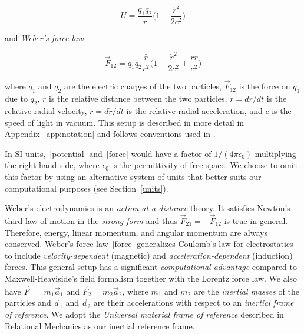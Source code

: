 \documentclass[12pt,a4paper]{article}
\theoremstyle{definition}
\theoremstyle{remark}
\newcommand{\qq}{q_1 q_2}
\newcommand{\rdot}{\dot{r}}
\begin{document}
\begin{equation}\label{potential}
    U = \frac{\qq}{r}\bigg(1 - \frac{\rdot^2}{2c^2}\bigg)
\end{equation}

and \textit{Weber's force law}

\begin{equation}\label{force}
    \vec{F}_{12} = \qq \frac{\hat{r}}{r^2}\bigg(1 - \frac{\rdot^2}{2c^2} + \frac{r\ddot{r}}{c^2}\bigg)
\end{equation}

where $q_1$ and $q_2$ are the electric charges of the two particles, $\vec{F}_{12}$ is the force on $q_1$ due to $q_2$, $r$ is the relative distance between the two particles, $\rdot = dr/dt$ is the relative radial velocity, $\ddot{r} = d\rdot/dt$ is the relative radial acceleration, and $c$ is the speed of light in vacuum. This setup is described in more detail in Appendix~\ref{app:notation} and follows conventions used in \citep{assis-weber}.

In SI units,~\eqref{potential} and~\eqref{force} would have a factor of $1/(4\pi \epsilon_0)$ multiplying the right-hand side, where $\epsilon_0$ is the permittivity of free space. We choose to omit this factor by using an alternative system of units that better suits our computational purposes (see Section~\ref{units}).

Weber's electrodynamics is an \textit{action-at-a-distance} theory. It satisfies Newton's third law of motion in the \textit{strong form} and thus $\vec{F}_{21} = -\vec{F}_{12}$ is true in general. Therefore, energy, linear momentum, and angular momentum are always conserved. Weber's force law~\eqref{force} generalizes Coulomb's law for electrostatics to include \textit{velocity-dependent} (magnetic) and \textit{acceleration-dependent} (induction) forces. This general setup has a significant \textit{computational advantage} compared to Maxwell-Heaviside's field formalism together with the Lorentz force law. We also have $\vec{F}_1 = m_1\vec{a}_1$ and $\vec{F}_2 = m_2\vec{a}_2$, where $m_1$ and $m_2$ are the \textit{inertial masses} of the particles and $\vec{a}_1$ and $\vec{a}_2$ are their accelerations with respect to an \textit{inertial frame of reference}. We adopt the \textit{Universal material frame of reference} described in Relational Mechanics \citep{assis-relational-mechanics} as our inertial reference frame.
\end{document}
